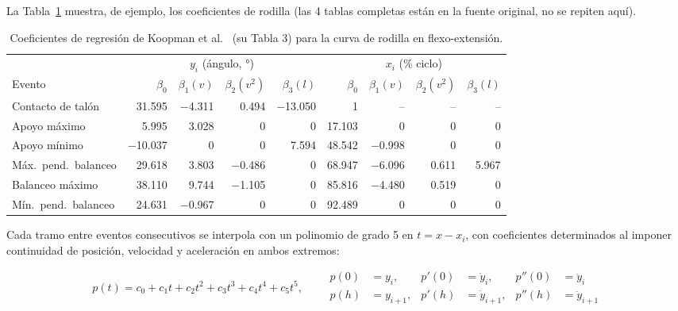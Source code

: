\documentclass[11pt,a4paper]{scrartcl}
\begin{document}
La Tabla~\ref{tab:koopman_rodilla} muestra, de ejemplo, los coeficientes de rodilla (las 4 tablas completas están en la fuente original, no se repiten aquí).

\begin{table}[H]
\centering
\caption{Coeficientes de regresión de Koopman et al.~\cite{Koopman2014} (su Tabla 3) para la curva de rodilla en flexo-extensión.}
\label{tab:koopman_rodilla}
\small
\begin{tabular}{@{}lrrrrrrrr@{}}
\toprule
& \multicolumn{4}{c}{$y_i$ (ángulo, °)} & \multicolumn{4}{c}{$x_i$ (\% ciclo)} \\
Evento & $\beta_0$ & $\beta_1(v)$ & $\beta_2(v^2)$ & $\beta_3(l)$ & $\beta_0$ & $\beta_1(v)$ & $\beta_2(v^2)$ & $\beta_3(l)$ \\
\midrule
Contacto de talón   & 31.595 & $-$4.311 & 0.494    & $-$13.050 & 1      & --     & --    & --     \\
Apoyo máximo        & 5.995  & 3.028    & 0        & 0         & 17.103  & 0      & 0     & 0      \\
Apoyo mínimo        & $-$10.037 & 0     & 0        & 7.594     & 48.542  & $-$0.998 & 0   & 0      \\
Máx.\ pend.\ balanceo & 29.618 & 3.803  & $-$0.486 & 0         & 68.947  & $-$6.096 & 0.611 & 5.967 \\
Balanceo máximo     & 38.110 & 9.744    & $-$1.105 & 0         & 85.816  & $-$4.480 & 0.519 & 0      \\
Mín.\ pend.\ balanceo & 24.631 & $-$0.967 & 0      & 0         & 92.489  & 0      & 0     & 0      \\
\bottomrule
\end{tabular}
\end{table}

Cada tramo entre eventos consecutivos se interpola con un polinomio de grado 5 en $t=x-x_i$, con coeficientes determinados al imponer continuidad de posición, velocidad y aceleración en ambos extremos:

\begin{equation}
p(t) = c_0 + c_1 t + c_2 t^2 + c_3 t^3 + c_4 t^4 + c_5 t^5,
\qquad
\begin{aligned}
p(0)&=y_i, & p'(0)&=\dot y_i, & p''(0)&=\ddot y_i\\
p(h)&=y_{i+1}, & p'(h)&=\dot y_{i+1}, & p''(h)&=\ddot y_{i+1}
\end{aligned}
\label{eq:hermite_quintico}
\end{equation}
\end{document}
